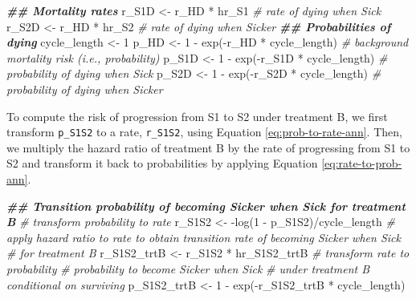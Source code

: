 \documentclass[
]{article}
\newenvironment{Shaded}{\begin{snugshade}}{\end{snugshade}}
\newcommand{\CommentTok}[1]{\textcolor[rgb]{0.56,0.35,0.01}{\textit{#1}}}
\newcommand{\DecValTok}[1]{\textcolor[rgb]{0.00,0.00,0.81}{#1}}
\newcommand{\DocumentationTok}[1]{\textcolor[rgb]{0.56,0.35,0.01}{\textbf{\textit{#1}}}}
\newcommand{\FunctionTok}[1]{\textcolor[rgb]{0.00,0.00,0.00}{#1}}
\newcommand{\NormalTok}[1]{#1}
\newcommand{\OtherTok}[1]{\textcolor[rgb]{0.56,0.35,0.01}{#1}}
\newcommand{\SpecialCharTok}[1]{\textcolor[rgb]{0.00,0.00,0.00}{#1}}
\begin{document}
\begin{Shaded}
\begin{Highlighting}[]
\DocumentationTok{\#\# Mortality rates}
\NormalTok{r\_S1D }\OtherTok{\textless{}{-}}\NormalTok{ r\_HD }\SpecialCharTok{*}\NormalTok{ hr\_S1 }\CommentTok{\# rate of dying when Sick}
\NormalTok{r\_S2D }\OtherTok{\textless{}{-}}\NormalTok{ r\_HD }\SpecialCharTok{*}\NormalTok{ hr\_S2 }\CommentTok{\# rate of dying when Sicker}
\DocumentationTok{\#\# Probabilities of dying}
\NormalTok{cycle\_length }\OtherTok{\textless{}{-}} \DecValTok{1}
\NormalTok{p\_HD  }\OtherTok{\textless{}{-}} \DecValTok{1} \SpecialCharTok{{-}} \FunctionTok{exp}\NormalTok{(}\SpecialCharTok{{-}}\NormalTok{r\_HD }\SpecialCharTok{*}\NormalTok{ cycle\_length)  }\CommentTok{\# background mortality risk (i.e., probability)}
\NormalTok{p\_S1D }\OtherTok{\textless{}{-}} \DecValTok{1} \SpecialCharTok{{-}} \FunctionTok{exp}\NormalTok{(}\SpecialCharTok{{-}}\NormalTok{r\_S1D }\SpecialCharTok{*}\NormalTok{ cycle\_length) }\CommentTok{\# probability of dying when Sick}
\NormalTok{p\_S2D }\OtherTok{\textless{}{-}} \DecValTok{1} \SpecialCharTok{{-}} \FunctionTok{exp}\NormalTok{(}\SpecialCharTok{{-}}\NormalTok{r\_S2D }\SpecialCharTok{*}\NormalTok{ cycle\_length) }\CommentTok{\# probability of dying when Sicker}
\end{Highlighting}
\end{Shaded}

To compute the risk of progression from S1 to S2 under treatment B, we first transform \texttt{p\_S1S2} to a rate, \texttt{r\_S1S2}, using Equation \eqref{eq:prob-to-rate-ann}. Then, we multiply the hazard ratio of treatment B by the rate of progressing from S1 to S2 and transform it back to probabilities by applying Equation \eqref{eq:rate-to-prob-ann}.

\begin{Shaded}
\begin{Highlighting}[]
\DocumentationTok{\#\# Transition probability of becoming Sicker when Sick for treatment B}
\CommentTok{\# transform probability to rate}
\NormalTok{r\_S1S2 }\OtherTok{\textless{}{-}} \SpecialCharTok{{-}}\FunctionTok{log}\NormalTok{(}\DecValTok{1} \SpecialCharTok{{-}}\NormalTok{ p\_S1S2)}\SpecialCharTok{/}\NormalTok{cycle\_length}
\CommentTok{\# apply hazard ratio to rate to obtain transition rate of becoming Sicker when Sick }
\CommentTok{\# for treatment B}
\NormalTok{r\_S1S2\_trtB }\OtherTok{\textless{}{-}}\NormalTok{ r\_S1S2 }\SpecialCharTok{*}\NormalTok{ hr\_S1S2\_trtB}
\CommentTok{\# transform rate to probability}
\CommentTok{\# probability to become Sicker when Sick }
\CommentTok{\# under treatment B conditional on surviving}
\NormalTok{p\_S1S2\_trtB }\OtherTok{\textless{}{-}} \DecValTok{1} \SpecialCharTok{{-}} \FunctionTok{exp}\NormalTok{(}\SpecialCharTok{{-}}\NormalTok{r\_S1S2\_trtB }\SpecialCharTok{*}\NormalTok{ cycle\_length) }
\end{Highlighting}
\end{Shaded}
\end{document}
